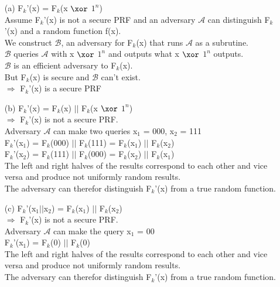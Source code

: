 \begin{itemize}
\item[(a)]
	F\(_{k}\)'(x) = F\(_{k}\)(x  \(\xor\)  \(1^{n}\)) \\
	Assume F\(_{k}\)'(x) is not a secure PRF and an adversary \(\mathcal{A}\) can distinguish F\(_{k}\)'(x) and a random function f(x).\\
	We construct \(\mathcal{B}\), an adversary for F\(_{k}\)(x) that runs \(\mathcal{A}\) as a subrutine.\\
	\(\mathcal{B}\) queries \(\mathcal{A}\) with x  \(\xor\)  \(1^{n}\) and outputs what x  \(\xor\)  \(1^{n}\) outputs.\\
	\(\mathcal{B}\) is an efficient adversary to  F\(_{k}\)(x).\\
	But  F\(_{k}\)(x) is secure and \(\mathcal{B}\)  can't exist. \\
	\(\Rightarrow\) F\(_{k}\)'(x) is a secure PRF \\

\item[(b)]
	F\(_{k}\)'(x) =  F\(_{k}\)(x) \(\vert \vert\) F\(_{k}\)(x  \(\xor\)  \(1^{n}\)) \\
	\(\Rightarrow\) F\(_{k}\)'(x) is not a secure PRF.\\
	Adversary \(\mathcal{A}\) can make two queries x\(_{1}\) = 000, x\(_{2}\) = 111 \\
	F\(_{k}\)'(x\(_{1}\)) = F\(_{k}\)(000)  \(\vert \vert\) F\(_{k}\)(111) = F\(_{k}\)(x\(_{1}\))  \(\vert \vert\) F\(_{k}\)(x\(_{2}\)) \\
	F\(_{k}\)'(x\(_{2}\)) = F\(_{k}\)(111)  \(\vert \vert\) F\(_{k}\)(000) = F\(_{k}\)(x\(_{2}\))  \(\vert \vert\) F\(_{k}\)(x\(_{1}\)) \\
	The left and right halves of the results correspond to each other and vice versa and produce not uniformly random results.\\
	The adversary can therefor distinguish F\(_{k}\)'(x) from a true random function.\\
	
\item[(c)]
	F\(_{k}\)'(x\(_{1}\)\(\vert \vert\)x\(_{2}\)) =  F\(_{k}\)(x\(_{1}\)) \(\vert \vert\) F\(_{k}\)(x\(_{2}\)) \\
	\(\Rightarrow\) F\(_{k}\)'(x) is not a secure PRF.\\
	Adversary \(\mathcal{A}\) can make the query x\(_{1}\) = 00 \\
	F\(_{k}\)'(x\(_{1}\)) =  F\(_{k}\)(0) \(\vert \vert\) F\(_{k}\)(0) \\
	The left and right halves of the results correspond to each other and vice versa and produce not uniformly random results.\\
	The adversary can therefor distinguish F\(_{k}\)'(x) from a true random function.\\


\end{itemize}
